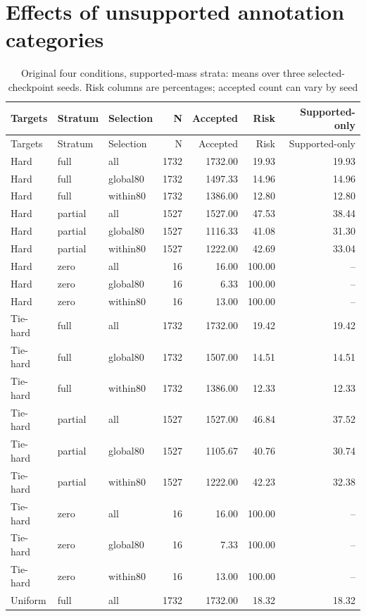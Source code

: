 \documentclass[10pt]{article}
\begin{document}
\clearpage\section{Effects of unsupported annotation categories}\label{supp:unsupported}
\begin{longtable}{lllrrrr}
\caption{Original four conditions, supported-mass strata: means over three selected-checkpoint seeds. Risk columns are percentages; accepted count can vary by seed}\\
\toprule Targets & Stratum & Selection & N & Accepted & Risk & Supported-only\\\midrule\endfirsthead
\toprule Targets & Stratum & Selection & N & Accepted & Risk & Supported-only\\\midrule\endhead
Hard & full & all & 1732 & 1732.00 & 19.93 & 19.93\\
Hard & full & global80 & 1732 & 1497.33 & 14.96 & 14.96\\
Hard & full & within80 & 1732 & 1386.00 & 12.80 & 12.80\\
Hard & partial & all & 1527 & 1527.00 & 47.53 & 38.44\\
Hard & partial & global80 & 1527 & 1116.33 & 41.08 & 31.30\\
Hard & partial & within80 & 1527 & 1222.00 & 42.69 & 33.04\\
Hard & zero & all & 16 & 16.00 & 100.00 & --\\
Hard & zero & global80 & 16 & 6.33 & 100.00 & --\\
Hard & zero & within80 & 16 & 13.00 & 100.00 & --\\
\addlinespace
Tie-hard & full & all & 1732 & 1732.00 & 19.42 & 19.42\\
Tie-hard & full & global80 & 1732 & 1507.00 & 14.51 & 14.51\\
Tie-hard & full & within80 & 1732 & 1386.00 & 12.33 & 12.33\\
Tie-hard & partial & all & 1527 & 1527.00 & 46.84 & 37.52\\
Tie-hard & partial & global80 & 1527 & 1105.67 & 40.76 & 30.74\\
Tie-hard & partial & within80 & 1527 & 1222.00 & 42.23 & 32.38\\
Tie-hard & zero & all & 16 & 16.00 & 100.00 & --\\
Tie-hard & zero & global80 & 16 & 7.33 & 100.00 & --\\
Tie-hard & zero & within80 & 16 & 13.00 & 100.00 & --\\
\addlinespace
Uniform & full & all & 1732 & 1732.00 & 18.32 & 18.32\\

\end{longtable}
\end{document}
